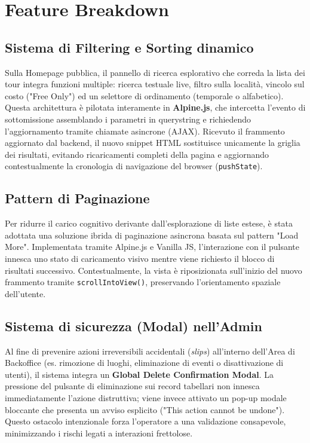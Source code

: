 \section{Feature Breakdown}

\subsection{Sistema di Filtering e Sorting dinamico}
Sulla Homepage pubblica, il pannello di ricerca esplorativo che correda la lista dei tour integra funzioni multiple: ricerca testuale live, filtro sulla località, vincolo sul costo ("Free Only") ed un selettore di ordinamento (temporale o alfabetico). Questa architettura è pilotata interamente in \textbf{Alpine.js}, che intercetta l'evento di sottomissione assemblando i parametri in querystring e richiedendo l'aggiornamento tramite chiamate asincrone (AJAX). Ricevuto il frammento aggiornato dal backend, il nuovo snippet HTML sostituisce unicamente la griglia dei risultati, evitando ricaricamenti completi della pagina e aggiornando contestualmente la cronologia di navigazione del browser (\texttt{pushState}).

\subsection{Pattern di Paginazione}
Per ridurre il carico cognitivo derivante dall'esplorazione di liste estese, è stata adottata una soluzione ibrida di paginazione asincrona basata sul pattern "Load More". Implementata tramite Alpine.js e Vanilla JS, l'interazione con il pulsante innesca uno stato di caricamento visivo mentre viene richiesto il blocco di risultati successivo. Contestualmente, la vista è riposizionata sull'inizio del nuovo frammento tramite \texttt{scrollIntoView()}, preservando l'orientamento spaziale dell'utente.

\subsection{Sistema di sicurezza (Modal) nell'Admin}
Al fine di prevenire azioni irreversibili accidentali (\textit{slips}) all'interno dell'Area di Backoffice (es. rimozione di luoghi, eliminazione di eventi o disattivazione di utenti), il sistema integra un \textbf{Global Delete Confirmation Modal}. La pressione del pulsante di eliminazione sui record tabellari non innesca immediatamente l'azione distruttiva; viene invece attivato un pop-up modale bloccante che presenta un avviso esplicito ("This action cannot be undone"). Questo ostacolo intenzionale forza l'operatore a una validazione consapevole, minimizzando i rischi legati a interazioni frettolose.

